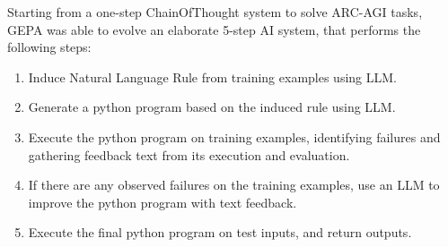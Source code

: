 Starting from a one-step ChainOfThought system to solve ARC-AGI tasks, GEPA was able to evolve an elaborate 5-step AI system, that performs the following steps:
\begin{enumerate}
    \item Induce Natural Language Rule from training examples using LLM.
    \item Generate a python program based on the induced rule using LLM.
    \item Execute the python program on training examples, identifying failures and gathering feedback text from its execution and evaluation.
    \item If there are any observed failures on the training examples, use an LLM to improve the python program with text feedback.
    \item Execute the final python program on test inputs, and return outputs.
\end{enumerate}

